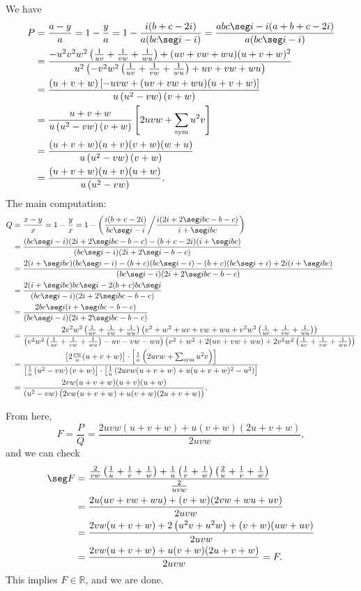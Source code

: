 We have
\begin{align*}
    P&=\frac{a-y}a=1-\frac ya
    =1-\frac{i(b+c-2i)}{a(bc\seg i-i)}=\frac{abc\seg i-i(a+b+c-2i)}{a(bc\seg i-i)}\\
    &=\frac{-u^2v^2w^2\left(\frac1{uv}+\frac1{vw}+\frac1{wu}\right)+(uv+vw+wu)(u+v+w)^2}{u^2\left(-v^2w^2\left(\frac1{uv}+\frac1{vw}+\frac1{wu}\right)+uv+vw+wu\right)}\\
    &=\frac{(u+v+w)\left[-uvw+(uv+vw+wu)(u+v+w)\right]}{u\left(u^2-vw\right)(v+w)}\\
    &=\frac{u+v+w}{u\left(u^2-vw\right)(v+w)}\left[2uvw+\sum_\mathrm{sym}u^2v\right]\\
    &=\frac{(u+v+w)(u+v)(v+w)(w+u)}{u\left(u^2-vw\right)(v+w)}\\
    &=\frac{(u+v+w)(u+v)(u+w)}{u\left(u^2-vw\right)}.
\end{align*}
The main computation:
\begin{align*}
    Q&=\frac{x-y}x=1-\frac yx=1-\left(\frac{i(b+c-2i)}{bc\seg i-i}\bigg/\frac{i(2i+2\seg ibc-b-c)}{i+\seg ibc}\right)\\
    &=\frac{(bc\seg i-i)(2i+2\seg ibc-b-c)-(b+c-2i)(i+\seg ibc)}{(bc\seg i-i)(2i+2\seg i-b-c)}\\
    &=\frac{2(i+\seg ibc)(bc\seg i-i)-(b+c)(bc\seg i-i)-(b+c)(bc\seg i+i)+2i(i+\seg ibc)}{(bc\seg i-i)(2i+2\seg ibc-b-c)}\\
    &=\frac{2(i+\seg ibc)bc\seg i-2(b+c)bc\seg i}{(bc\seg i-i)(2i+2\seg ibc-b-c)}\\
    &=\frac{2bc\seg i(i+\seg ibc-b-c)}{(bc\seg i-i)(2i+2\seg ibc-b-c)}\\
    &=\frac{2v^2w^2\left(\frac1{uv}+\frac1{vw}+\frac1{wu}\right)\left(v^2+w^2+uv+vw+wu+v^2w^2\left(\frac1{uv}+\frac1{vw}+\frac1{wu}\right)\right)}{\left(v^2w^2\left(\frac1{uv}+\frac1{vw}+\frac1{wu}\right)-uv-vw-wu\right)\left(v^2+w^2+2(uv+vw+wu)+2v^2w^2\left(\frac1{uv}+\frac1{vw}+\frac1{wu}\right)\right)}\\
    &=\frac{\left[2\frac{vw}u(u+v+w)\right]\cdot\left[\frac1u\left(2uvw+\sum_\mathrm{sym}u^2v\right)\right]}{\left[\frac1u\left(u^2-vw\right)(v+w)\right]\cdot\left[\frac1u\left(2uvw(u+v+w)+u(u+v+w)^2-u^3\right)\right]}\\
    &=\frac{2vw(u+v+w)(u+v)(u+w)}{\left(u^2-vw\right)\big(2vw(u+v+w)+u(v+w)(2u+v+w)\big)}.
\end{align*}

From here, \[F=\frac PQ=\frac{2uvw(u+v+w)+u(v+w)(2u+v+w)}{2uvw},\]
and we can check
\begin{align*}
    \seg F&=\frac{\frac2{vw}\left(\frac1u+\frac1v+\frac1w\right)+\frac1u\left(\frac1v+\frac1w\right)\left(\frac2u+\frac1v+\frac1w\right)}{\frac2{uvw}}\\
    &=\frac{2u(uv+vw+wu)+(v+w)(2vw+wu+uv)}{2uvw}\\
    &=\frac{2vw(u+v+w)+2\left(u^2v+u^2w\right)+(v+w)(uw+uv)}{2uvw}\\
    &=\frac{2vw(u+v+w)+u(v+w)(2u+v+w)}{2uvw}=F.
\end{align*}
This implies $F\in\mathbb R$, and we are done.
